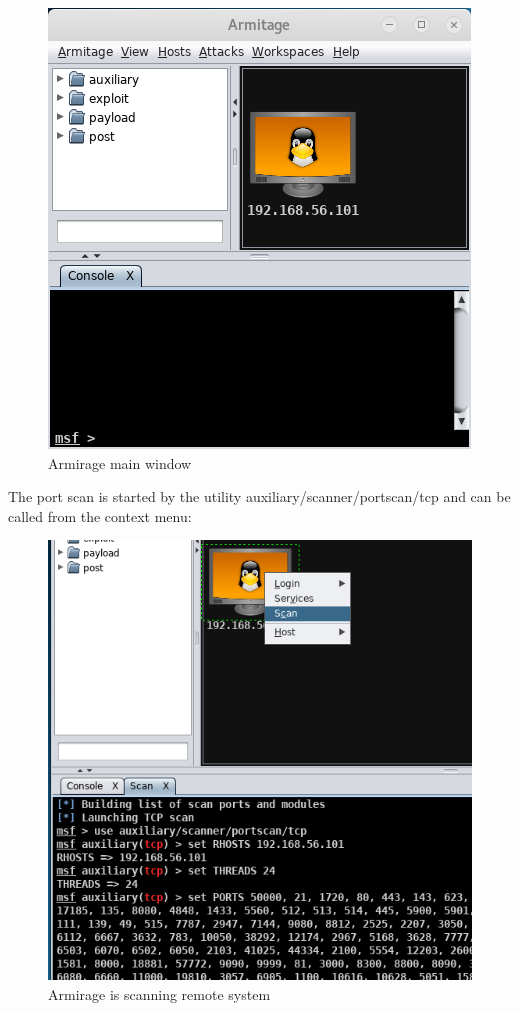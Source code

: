 \documentclass[14pt,a4paper,report]{report}
\begin{document}
\begin{figure}[h!]
	\centering
	\includegraphics[scale = 0.77]{images/2.png}
	\caption{Armirage main window}
\end{figure}

The port scan is started by the utility auxiliary/scanner/portscan/tcp and can be called from the context menu:

\begin{figure}[h!]
	\centering
	\includegraphics[scale = 0.80]{images/3.png}
	\caption{Armirage is scanning remote system}
\end{figure}
\end{document}
